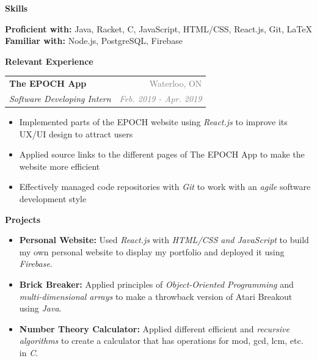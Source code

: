 \documentclass[letterpaper,11pt]{article}
\makeatletter
\newcommand{\resheading}[1]{{\large \colorbox{LightMidnightBlue}{\begin{minipage}{\textwidth}{\textbf{\textrm{#1 \vphantom{p\^{E}}}}}\end{minipage}}}}
\newcommand{\ressubheading}[4]{
\begin{tabular*}{7in}{l@{\extracolsep{\fill}}r}
        \textbf{#1} & \textcolor{gray}{#2} \\
        \textit{#3} & \textcolor{gray}{\textit{#4}} \\
\end{tabular*}\vspace{-6pt}}
\makeatother
\begin{document}
\sffamily

\hline

\vspace{2.5mm}

\resheading{Skills}

\vspace{2mm}

\textbf{Proficient with:} Java, Racket, C, JavaScript, HTML/CSS, React.js, Git, \LaTeX \\
\vspace{1.75mm}
\textbf{Familiar with:} Node.js, PostgreSQL, Firebase

\vspace{2mm}

\resheading{Relevant Experience}

\vspace{2mm}

    \ressubheading{The EPOCH App}{Waterloo, ON}{Software Developing Intern}{Feb. 2019 - Apr. 2019}
        \begin{itemize}
        \setlength\itemsep{0.75mm}
            \item Implemented parts of the EPOCH website using \textit{React.js} to improve its UX/UI design to attract users
            \item Applied source links to the different pages of The EPOCH App to make the website more efficient
            \item Effectively managed code repositories with \textit{Git} to work with an \textit{agile} software development style
        \end{itemize}
        
\vspace{2mm}

\resheading{Projects}

\begin{itemize}
    \setlength\itemsep{0.5mm}
    \item \textbf{Personal Website:} Used \textit{React.js} with \textit{HTML/CSS and JavaScript} to build my own personal website to display my portfolio and deployed it using \textit{Firebase}.
    \item \textbf{Brick Breaker:} Applied principles of \textit{Object-Oriented Programming} and \textit{multi-dimensional arrays} to make a throwback version of Atari Breakout using \textit{Java}.
    \item \textbf{Number Theory Calculator:} Applied different efficient and \textit{recursive algorithms} to create a calculator that has operations for mod, gcd, lcm, etc. in \textit{C}.
\end{itemize}
\end{document}
